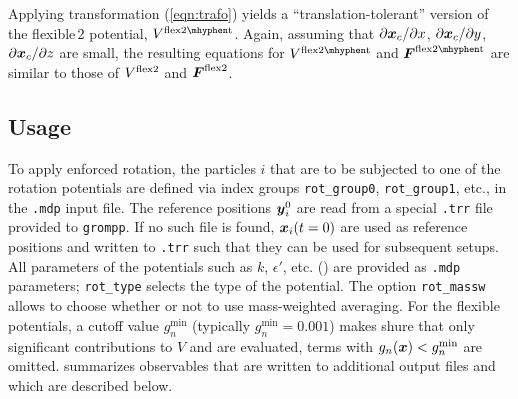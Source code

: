Applying transformation (\ref{eqn:trafo}) yields a ``translation-tolerant''
version of the flexible\,2 potential, $V\rotflextwot$. Again,
assuming that $\partial \mbox{\boldmath ${x}$}_c / \partial x$,  $\partial \mbox{\boldmath ${x}$}_c /
\partial y$, $\partial \mbox{\boldmath ${x}$}_c / \partial z$ are small, the
resulting equations for $V\rotflextwot$ and $\ve{F}\rotflextwot$ are
similar to those of $V^\mathrm{flex2}$ and $\mbox{\boldmath ${F}$}^\mathrm{flex2}$.

\subsection{Usage}
To apply enforced rotation, the particles $i$ that are to
be subjected to one of the rotation potentials are defined via index groups
{\tt rot\_group0}, {\tt rot\_group1}, etc., in the {\tt .mdp} input file. 
The reference positions $\mbox{\boldmath ${y}$}_i^0$ are
read from a special {\tt .trr} file provided to {\tt grompp}. If no such file is found,
$\mbox{\boldmath ${x}$}_i(t=0)$ are used as reference positions and written to {\tt .trr} such
that they can be used for subsequent setups. All parameters of the potentials
such as $k$, $\epsilon'$, etc. () are provided as {\tt .mdp}
parameters; {\tt rot\_type} selects the type of the potential. 
The option {\tt rot\_massw} allows to choose whether or not to use
mass-weighted averaging. 
For the flexible potentials, a cutoff value $g_n^\mathrm{min}$ 
(typically  $g_n^\mathrm{min}=0.001$) makes shure that only
significant contributions to $V$ and  are evaluated, {\ie} terms with 
$g_n(\mbox{\boldmath ${x}$}) < g_n^\mathrm{min}$ are omitted.
 summarizes observables that are written
to additional output files and which are described below.


